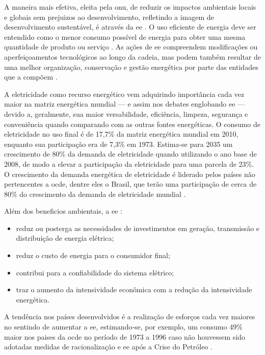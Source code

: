 A maneira mais efetiva, eleita pela \gls{onu}, de reduzir 
os impactos ambientais locais e globais sem prejuizos ao desenvolvimento, 
refletindo a imagem de desenvolvimento sustentável, é através da \gls{ee}
\cite{rippel,onu,dissert_cursino}. O uso eficiente de energia deve ser entendido como 
o menor consumo possível de energia para obter uma mesma 
quantidade de produto ou serviço \cite{pne30_eff_energ}. 
As ações de \gls{ee} compreendem modificações ou aperfeiçoamentos tecnológicos ao longo
da cadeia, mas podem também resultar de uma melhor organização, conservação e
gestão energética por parte das entidades que a compõem \cite{pnef}. 

A eletricidade como recurso energético vem adquirindo importância cada vez maior na 
matriz energética mundial --- e assim nos debates englobando \gls{ee} ---
devido a, geralmente, sua maior versabilidade, eficiência, limpeza, segurança e conveniência 
quando comparando com as outras fontes energéticas. O consumo de eletricidade no uso final é de 17,7\% 
da matriz energética mundial em 2010, enquanto sua participação era de 7,3\% em 1973. Estima-se para 2035 um
crescimento de 80\% da demanda de eletricidade quando utilizando o ano base de
2008, de modo a elevar a participação da eletricidade para uma parcela de 23\%. O crescimento da demanda energética 
de eletricidade é liderado pelos países não pertencentes a \gls{ocde}, dentre
eles o Brasil, que terão uma participação de cerca de 80\% do crescimento da demanda de
eletricidade mundial \cite{iea_weo2010}.

Além dos beneficios ambientais, a \gls{ee} \cite{jannuzzi,epe_slides_eficiencia}: 

\begin{itemize}
\item reduz ou posterga as necessidades de investimentos em geração, transmissão 
e distribuição de energia elétrica; 
\item reduz o custo de energia para o consumidor final; 
\item contribui para a confiabilidade do sistema elétrico; 
\item traz o aumento da intensividade econômica com a redução da intensividade
energética. 
\end{itemize}

A tendência nos países desenvolvidos é a realização de esforços 
cada vez maiores no sentindo de aumentar a \gls{ee}, 
estimando-se, por exemplo, um consumo 49\% maior nos paises da \gls{ocde} 
no período de 1973 a 1996 caso não houvessem sido adotadas medidas de 
racionalização e \gls{ee} após a Crise do Petróleo
\cite{goldemberg,epe_slides_eficiencia}.

